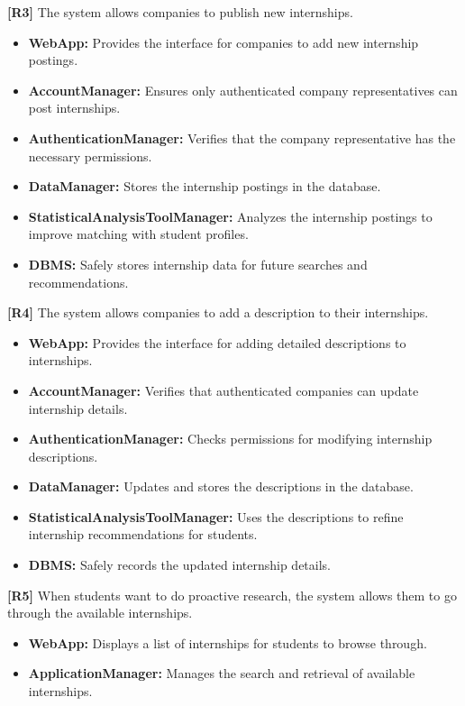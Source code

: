 \textbf{[R3]} The system allows companies to publish new internships.  
\begin{itemize}
    \item \textbf{WebApp:} Provides the interface for companies to add new internship postings.
    \item \textbf{AccountManager:} Ensures only authenticated company representatives can post internships.
    \item \textbf{AuthenticationManager:} Verifies that the company representative has the necessary permissions.
    \item \textbf{DataManager:} Stores the internship postings in the database.
    \item \textbf{StatisticalAnalysisToolManager:} Analyzes the internship postings to improve matching with student profiles.
    \item \textbf{DBMS:} Safely stores internship data for future searches and recommendations.
\end{itemize}

\textbf{[R4]} The system allows companies to add a description to their internships.  
\begin{itemize}
    \item \textbf{WebApp:} Provides the interface for adding detailed descriptions to internships.
    \item \textbf{AccountManager:} Verifies that authenticated companies can update internship details.
    \item \textbf{AuthenticationManager:} Checks permissions for modifying internship descriptions.
    \item \textbf{DataManager:} Updates and stores the descriptions in the database.
    \item \textbf{StatisticalAnalysisToolManager:} Uses the descriptions to refine internship recommendations for students.
    \item \textbf{DBMS:} Safely records the updated internship details.
\end{itemize}

\textbf{[R5]} When students want to do proactive research, the system allows them to go through the available internships.  
\begin{itemize}
    \item \textbf{WebApp:} Displays a list of internships for students to browse through.
    \item \textbf{ApplicationManager:} Manages the search and retrieval of available internships.
\end{itemize}

